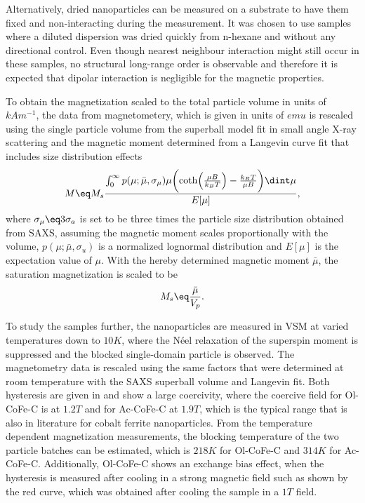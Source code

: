 \documentclass[\main/dresen_thesis.tex]{subfiles}
\begin{document}
    Alternatively, dried nanoparticles can be measured on a substrate to have them fixed and non-interacting during the measurement.
    It was chosen to use samples where a diluted dispersion was dried quickly from n-hexane and without any directional control.
    Even though nearest neighbour interaction might still occur in these samples, no structural long-range order is observable and therefore it is expected that dipolar interaction is negligible for the magnetic properties.

    To obtain the magnetization scaled to the total particle volume in units of $\unit{kAm^{-1}}$, the data from magnetometery, which is given in units of $\unit{emu}$ is rescaled using the single particle volume from the superball model fit in small angle X-ray scattering and the magnetic moment determined from a Langevin curve fit that includes size distribution effects
    \begin{align}
      M \eq M_s
      \frac
      {\int_{0}^{\infty} p(\mu; \bar{\mu}, \sigma_\mu) \mu \biggl( \coth\Bigl(\frac{\mu B}{k_B T} \Bigr) - \frac{k_B T}{\mu B} \biggr) \dint \mu}
      {E[\mu]},
    \end{align}
    where $\sigma_\mu \eq 3 \sigma_a$ is set to be three times the particle size distribution obtained from SAXS, assuming the magnetic moment scales proportionally with the volume, $p(\mu; \bar{\mu}, \sigma_u)$ is a normalized lognormal distribution and $E[\mu]$ is the expectation value of $\mu$.
    With the hereby determined magnetic moment $\bar{\mu}$, the saturation magnetization is scaled to be
    \begin{align}
      M_s \eq \frac{\bar{\mu}}{V_p}.
    \end{align}

    To study the samples further, the nanoparticles are measured in VSM at varied temperatures down to $10 \unit{K}$, where the N\'eel relaxation of the superspin moment is suppressed and the blocked single-domain particle is observed.
    The magnetometry data is rescaled using the same factors that were determined at room temperature with the SAXS superball volume and Langevin fit.
    Both hysteresis are given in  and show a large coercivity, where the coercive field for Ol-CoFe-C is at $1.2 \unit{T}$ and for Ac-CoFe-C at $1.9 \unit{T}$, which is the typical range that is also in literature for cobalt ferrite nanoparticles.
    From the temperature dependent magnetization measurements, the blocking temperature of the two particle batches can be estimated, which is $218 \unit{K}$ for Ol-CoFe-C and $314 \unit{K}$ for Ac-CoFe-C.
    Additionally, Ol-CoFe-C shows an exchange bias effect, when the hysteresis is measured after cooling in a strong magnetic field such as shown by the red curve, which was obtained after cooling the sample in a $1 \unit{T}$ field.
\end{document}
